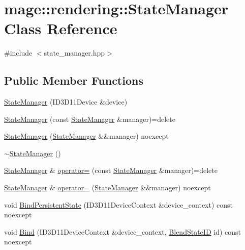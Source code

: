 \hypertarget{classmage_1_1rendering_1_1_state_manager}{}\section{mage\+:\+:rendering\+:\+:State\+Manager Class Reference}
\label{classmage_1_1rendering_1_1_state_manager}


{\ttfamily \#include $<$state\+\_\+manager.\+hpp$>$}

\subsection*{Public Member Functions}
\begin{DoxyCompactItemize}
\item 
\hyperlink{classmage_1_1rendering_1_1_state_manager_ae19649b2bfc0fc7eb3110fb85cda26b7}{State\+Manager} (I\+D3\+D11\+Device \&device)
\item 
\hyperlink{classmage_1_1rendering_1_1_state_manager_aa5e404cde4e010a5738815d1d4938585}{State\+Manager} (const \hyperlink{classmage_1_1rendering_1_1_state_manager}{State\+Manager} \&manager)=delete
\item 
\hyperlink{classmage_1_1rendering_1_1_state_manager_ab5a87ec8d14f9b249685b52e159888b2}{State\+Manager} (\hyperlink{classmage_1_1rendering_1_1_state_manager}{State\+Manager} \&\&manager) noexcept
\item 
\hyperlink{classmage_1_1rendering_1_1_state_manager_a774d3147717773d6dce1f388bc960f87}{$\sim$\+State\+Manager} ()
\item 
\hyperlink{classmage_1_1rendering_1_1_state_manager}{State\+Manager} \& \hyperlink{classmage_1_1rendering_1_1_state_manager_a07e3b6663a4d3c814cddbd920bd4ced4}{operator=} (const \hyperlink{classmage_1_1rendering_1_1_state_manager}{State\+Manager} \&manager)=delete
\item 
\hyperlink{classmage_1_1rendering_1_1_state_manager}{State\+Manager} \& \hyperlink{classmage_1_1rendering_1_1_state_manager_a75eedc5c3a5345de8b6a1c4dea7491a1}{operator=} (\hyperlink{classmage_1_1rendering_1_1_state_manager}{State\+Manager} \&\&manager) noexcept
\item 
void \hyperlink{classmage_1_1rendering_1_1_state_manager_a44f34f1a75286e8eabaace46b21168c8}{Bind\+Persistent\+State} (I\+D3\+D11\+Device\+Context \&device\+\_\+context) const noexcept
\item 
void \hyperlink{classmage_1_1rendering_1_1_state_manager_aee24b65a57f9c47c4c74e509884d1978}{Bind} (I\+D3\+D11\+Device\+Context \&device\+\_\+context, \hyperlink{namespacemage_1_1rendering_abdf11cdb816b9208aec6c3a81f7564ab}{Blend\+State\+ID} id) const noexcept

\end{DoxyCompactItemize}
